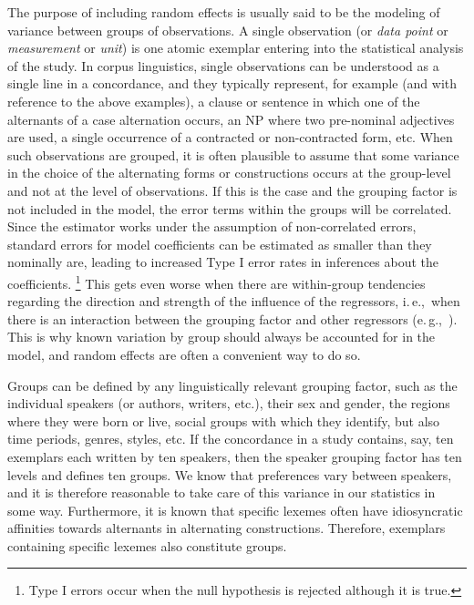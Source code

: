 \documentclass[a4paper,12pt]{article}
\newcommand{\ie}{i.\,e.,\ }
\newcommand{\eg}{e.\,g.,\ }
\begin{document}
The purpose of including random effects is usually said to be the modeling of variance between groups of observations.
A single observation (or \textit{data point} or \textit{measurement} or \textit{unit}) is one atomic exemplar entering into the statistical analysis of the study.
In corpus linguistics, single observations can be understood as a single line in a concordance, and they typically represent, for example (and with reference to the above examples), a clause or sentence in which one of the alternants of a case alternation occurs, an NP where two pre-nominal adjectives are used, a single occurrence of a contracted or non-contracted form, etc.
When such observations are grouped, it is often plausible to assume that some variance in the choice of the alternating forms or constructions occurs at the group-level and not at the level of observations.
If this is the case and the grouping factor is not included in the model, the error terms within the groups will be correlated.
Since the estimator works under the assumption of non-correlated errors, standard errors for model coefficients can be estimated as smaller than they nominally are, leading to increased Type I error rates in inferences about the coefficients.%
\footnote{Type I errors occur when the null hypothesis is rejected although it is true.}
This gets even worse when there are within-group tendencies regarding the direction and strength of the influence of the regressors, \ie when there is an interaction between the grouping factor and other regressors (\eg \citealt{SchielzethForstmeier2009}).
This is why known variation by group should always be accounted for in the model, and random effects are often a convenient way to do so.

Groups can be defined by any linguistically relevant grouping factor, such as the individual speakers (or authors, writers, etc.), their sex and gender, the regions where they were born or live, social groups with which they identify, but also time periods, genres, styles, etc.
If the concordance in a study contains, say, ten exemplars each written by ten speakers, then the speaker grouping factor has ten levels and defines ten groups.
We know that preferences vary between speakers, and it is therefore reasonable to take care of this variance in our statistics in some way.
Furthermore, it is known that specific lexemes often have idiosyncratic affinities towards alternants in alternating constructions.
Therefore, exemplars containing specific lexemes also constitute groups.
\end{document}
